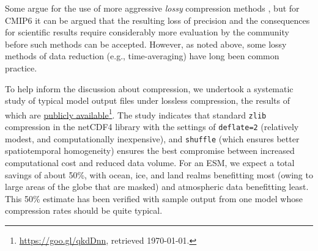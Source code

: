 \documentclass[gmd,manuscript]{copernicus}
\newcommand{\urlref}[2] {\href{#1}{#2}\footnote{\url{#1}, retrieved \today.}}
\begin{document}
Some argue for the use of more aggressive
\emph{lossy} compression methods \citep{ref:bakeretal2016}, but 
for CMIP6 it can be argued that the resulting loss of precision
 and the consequences for scientific results
require considerably more evaluation by the community before such
methods can be accepted. However, as noted above,
some lossy methods of data reduction (e.g., time-averaging) have long
been common practice.

To help inform the discussion about compression, we undertook a systematic study of 
typical model output files under lossless compression, the
results of which are \urlref{https://goo.gl/qkdDnn}{publicly available}.
The study indicates that standard \texttt{zlib} compression in the
netCDF4 library with the settings of \texttt{deflate=2} (relatively
modest, and computationally inexpensive), and \texttt{shuffle} (which
ensures better spatiotemporal homogeneity) ensures the best compromise
between increased computational cost and reduced data volume. For an
ESM,
we expect a total savings of about 50\%, with ocean, ice, and land realms
benefitting most (owing to large areas of the globe that are
masked) and atmospheric data benefitting least. This 50\% estimate has been
verified with sample output from one model whose compression rates should be quite typical.
\end{document}
